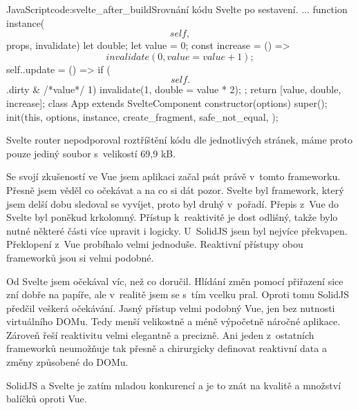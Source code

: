 \documentclass[
  master,
  program=ainf,
  tables=false,
  sourcecodes,
  glossaries,
  index
]{kidiplom}
\begin{document}

  \begin{kicode}{JavaScript}{code:svelte_after_build}{Srovnání kódu Svelte po sestavení.}
    ...
    function instance($$self, $$props, $$invalidate) {
      let double;
      let value = 0;
      const increase = () => $$invalidate(0, value = value + 1);
      $$self.$$.update = () => {
        if ($$self.$$.dirty & /*value*/
        1) { $$invalidate(1, double = value * 2); }
      };
      return [value, double, increase];
    }
    class App extends SvelteComponent {
      constructor(options) {
        super();
        init(this, options, instance, create_fragment, safe_not_equal, {});
      }
    }
\end{kicode}

Svelte \cite{svelte} router nepodporoval roztříštění kódu dle jednotlivých stránek, máme proto pouze jediný soubor
s~velikostí 69,9 kB.


\begin{kiconclusions}
  Se svojí zkušeností ve Vue jsem aplikaci začal psát právě v~tomto frameworku. Přesně jsem věděl co očekávat a na
  co si dát pozor. Svelte byl framework, který jsem delší dobu sledoval se vyvíjet, proto byl druhý v~pořadí. Přepis
  z~Vue do Svelte byl poněkud krkolomný. Přístup k~reaktivitě je dost odlišný, takže bylo nutné některé části více
  upravit i logicky. U~SolidJS jsem byl nejvíce překvapen. Překlopení z~Vue probíhalo velmi jednoduše. Reaktivní
  přístupy obou frameworků jsou si velmi podobné. 

  Od Svelte jsem očekával víc, než co doručil. Hlídání změn pomocí přiřazení sice zní dobře na papíře, ale v~realitě
  jsem se s~tím vcelku pral. Oproti tomu SolidJS předčil veškerá očekávání. Jasný přístup velmi podobný Vue, jen
  bez nutnosti virtuálního DOMu. Tedy menší velikostně a méně výpočetně náročné aplikace. Zároveň řeší reaktivitu velmi
  elegantně a precizně. Ani jeden z~ostatních frameworků neumožňuje tak přesně a chirurgicky definovat reaktivní data a
  změny způsobené do DOMu.
  
  SolidJS a Svelte je zatím mladou konkurencí a je to znát na kvalitě a množství balíčků oproti Vue. 
\end{kiconclusions}
\end{document}
